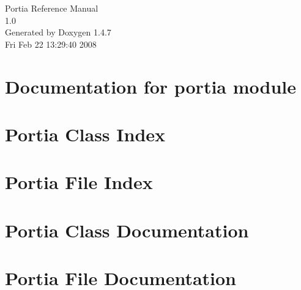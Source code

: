 \documentclass[a4paper]{book}
\begin{document}
\begin{titlepage}
\vspace*{7cm}
\begin{center}
{\Large Portia Reference Manual\\[1ex]\large 1.0 }\\
\vspace*{1cm}
{\large Generated by Doxygen 1.4.7}\\
\vspace*{0.5cm}
{\small Fri Feb 22 13:29:40 2008}\\
\end{center}
\end{titlepage}
\clearemptydoublepage
{}
\tableofcontents
\clearemptydoublepage
{}
\chapter{Documentation for portia module }
\label{index}
\chapter{Portia Class Index}

\chapter{Portia File Index}

\chapter{Portia Class Documentation}



\chapter{Portia File Documentation}




\printindex
\end{document}
